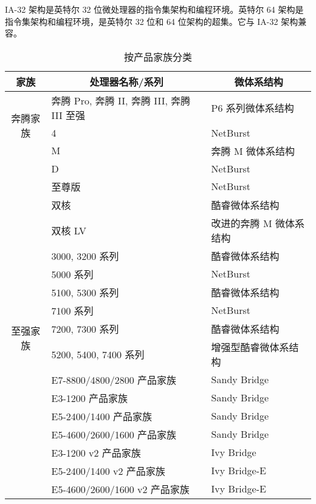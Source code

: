 IA-32 架构是英特尔 32 位微处理器的指令集架构和编程环境。英特尔 64 架构是指令集架构和编程环境，是英特尔 32 位和 64 位架构的超集。它与 IA-32 架构兼容。
\newpage
{}
\begin{multicols}{2}
\begin{table}[H]
  \centering
  \caption{按产品家族分类}
  \scriptsize
  \renewcommand\arraystretch{1.011}
    \begin{tabular}{|c|l|l|}
    \hline
    \textbf{家族} & \multicolumn{1}{c|}{\textbf{处理器名称/系列}} & \multicolumn{1}{c|}{\textbf{微体系结构}} \\
    \hline
    \multirow{3}[12]{*}{奔腾家族} & 奔腾 Pro, 奔腾 II, 奔腾 III, 奔腾 III 至强 & P6 系列微体系结构 \\
\cline{2-3}          & 4     & NetBurst \\
\cline{2-3}          & M     & 奔腾 M 微体系结构 \\
\cline{2-3}          & D     & NetBurst \\
\cline{2-3}          & 至尊版   & NetBurst \\
\cline{2-3}          & 双核    & 酷睿微体系结构 \\
    \hline
    \multirow{12}[46]{*}{至强家族} & 双核 LV & 改进的奔腾 M 微体系结构 \\
\cline{2-3}          & 3000, 3200 系列 & 酷睿微体系结构 \\
\cline{2-3}          & 5000 系列 & NetBurst \\
\cline{2-3}          & 5100, 5300 系列 & 酷睿微体系结构 \\
\cline{2-3}          & 7100 系列 & NetBurst \\
\cline{2-3}          & 7200, 7300 系列 & 酷睿微体系结构 \\
\cline{2-3}          & 5200, 5400, 7400 系列 & 增强型酷睿微体系结构 \\
\cline{2-3}          & E7-8800/4800/2800 产品家族 & Sandy Bridge \\
\cline{2-3}          & E3-1200 产品家族 & Sandy Bridge \\
\cline{2-3}          & E5-2400/1400 产品家族 & Sandy Bridge \\
\cline{2-3}          & E5-4600/2600/1600 产品家族 & Sandy Bridge \\
\cline{2-3}          & E3-1200 v2 产品家族 & Ivy Bridge \\
\cline{2-3}          & E5-2400/1400 v2 产品家族 & Ivy Bridge-E \\
\cline{2-3}          & E5-4600/2600/1600 v2 产品家族 & Ivy Bridge-E \\

\end{tabular}
\end{table}
\end{multicols}
